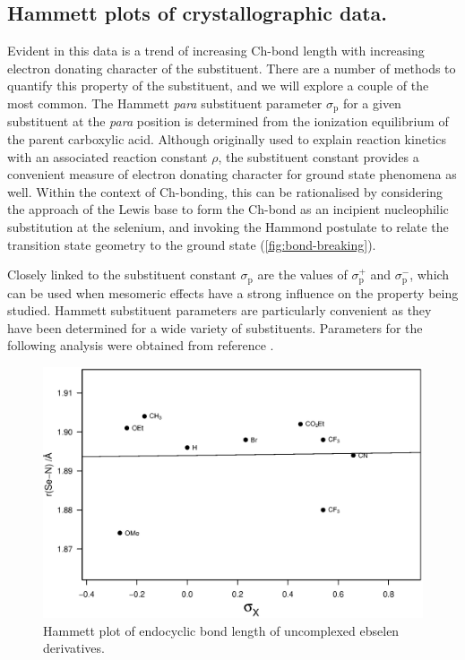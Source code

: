 \begin{refsection}
\subsection{Hammett plots of crystallographic data.}
Evident in this data is a trend of increasing Ch-bond length with increasing electron donating character of the substituent.
There are a number of methods to quantify this property of the substituent, and we will explore a couple of the most common.
The Hammett \textit{para} substituent parameter $ \sigma_\text{p} $ for a given substituent at the \textit{para} position is determined from the ionization equilibrium of the parent carboxylic acid.
Although originally used to explain reaction kinetics with an associated reaction constant $\rho$, the substituent constant provides a convenient measure of electron donating character for ground state phenomena as well.
Within the context of Ch-bonding, this can be rationalised by considering the approach of the Lewis base to form the Ch-bond as an incipient nucleophilic substitution at the selenium, and invoking the Hammond postulate to relate the transition state geometry to the ground state (\cref{fig:bond-breaking}).

Closely linked to the substituent constant $ \sigma_\text{p} $ are the values of $\sigma_\text{p}^{+}$ and $\sigma_\text{p}^{-}$, which can be used when mesomeric effects have a strong influence on the property being studied.
Hammett substituent parameters are particularly convenient as they have been determined for a wide variety of substituents.
Parameters for the following analysis were obtained from reference \cite{Hansch1991}.

\begin{figure}
    \centering
    \includegraphics[width=0.9\linewidth]{Figures/hammett-endo-free.eps}
    \caption{Hammett plot of endocyclic  bond length of uncomplexed ebselen derivatives.}\label{fig:hammett-endo-free}
\end{figure}


\end{refsection}
